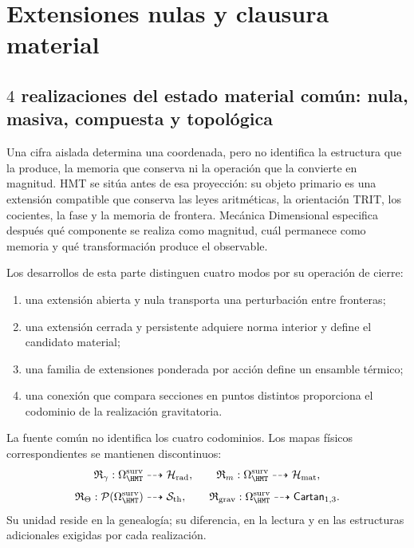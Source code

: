 \chapter{Extensiones nulas y clausura material}
\label{chap:realizaciones-nula-material}

\section{\(4\) realizaciones del estado material común: nula, masiva, compuesta y topológica}
\label{sec:cuatro-modos-realizacion}

Una cifra aislada determina una coordenada, pero no identifica la estructura
que la produce, la memoria que conserva ni la operación que la convierte en
magnitud. HMT se sitúa antes de esa proyección: su objeto primario es una
extensión compatible que conserva las leyes aritméticas, la orientación
TRIT, los cocientes, la fase y la memoria de frontera. Mecánica Dimensional
especifica después qué componente se realiza como magnitud, cuál permanece
como memoria y qué transformación produce el observable.

Los desarrollos de esta parte distinguen cuatro modos por su operación de
cierre:
\begin{enumerate}
 \item una extensión abierta y nula transporta una perturbación entre
 fronteras;
 \item una extensión cerrada y persistente adquiere norma interior y define
 el candidato material;
 \item una familia de extensiones ponderada por acción define un ensamble
 térmico;
 \item una conexión que compara secciones en puntos distintos proporciona el
 codominio de la realización gravitatoria.
\end{enumerate}
La fuente común no identifica los cuatro codominios. Los mapas físicos
correspondientes se mantienen discontinuos:
\[
 \mathfrak R_\gamma:
 \Omega_{\HMT}^{\rm surv}\dashrightarrow\mathcal H_{\rm rad},
 \qquad
 \mathfrak R_m:
 \Omega_{\HMT}^{\rm surv}\dashrightarrow\mathcal H_{\rm mat},
\]
\[
 \mathfrak R_\Theta:
 \mathcal P(\Omega_{\HMT}^{\rm surv})\dashrightarrow\mathcal S_{\rm th},
 \qquad
 \mathfrak R_{\rm grav}:
 \Omega_{\HMT}^{\rm surv}\dashrightarrow\mathsf{Cartan}_{1,3}.
\]
Su unidad reside en la genealogía; su diferencia, en la lectura y en las
estructuras adicionales exigidas por cada realización.


